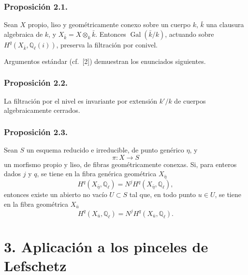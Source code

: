 \subsubsection*{Proposición 2.1.}
Sean $X$ propio, liso y geométricamente conexo sobre un cuerpo $k$,
$\bar k$ una clausura algebraica de $k$, y
$X_{\bar k}=X\otimes_k\bar k$. Entonces
$\operatorname{Gal}(\bar k/k)$, actuando sobre
$H^q(X_{\bar k},\mathbb Q_\ell(i))$, preserva la filtración por conivel.

Argumentos estándar (cf.~[2]) demuestran los enunciados siguientes.

\subsubsection*{Proposición 2.2.}
La filtración por el nivel es invariante por extensión $k'/k$ de
cuerpos algebraicamente cerrados.

\subsubsection*{Proposición 2.3.}
Sean $S$ un esquema reducido e irreducible, de punto genérico $\eta$, y
\begin{equation*}
\pi:X\longrightarrow S
\end{equation*}
un morfismo propio y liso, de fibras geométricamente conexas. Si, para
enteros dados $j$ y $q$, se tiene en la fibra genérica geométrica
$X_{\bar\eta}$
\begin{equation}\tag{2.3.1}
H^q(X_{\bar\eta},\mathbb Q_\ell)
=N^jH^q(X_{\bar\eta},\mathbb Q_\ell),
\end{equation}
entonces existe un abierto no vacío $U\subset S$ tal que, en todo punto
$u\in U$, se tiene en la fibra geométrica $X_{\bar u}$
\begin{equation}\tag{2.3.2}
H^q(X_{\bar u},\mathbb Q_\ell)
=N^jH^q(X_{\bar u},\mathbb Q_\ell).
\end{equation}

\pageoriginale

\section*{3. Aplicación a los pinceles de Lefschetz}

